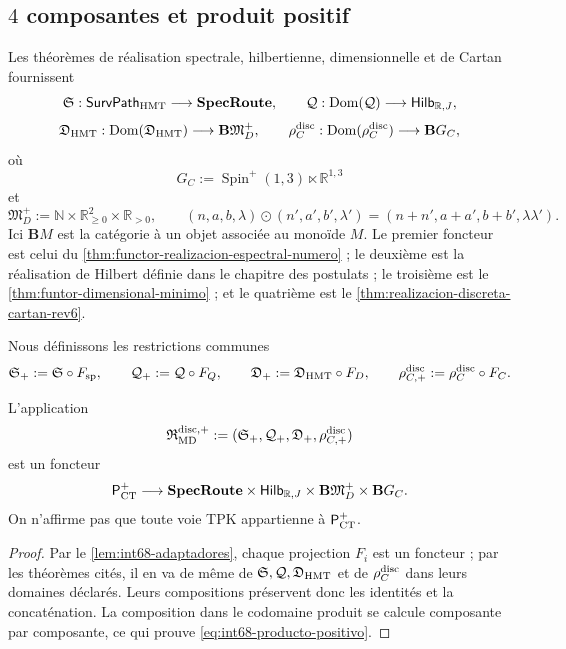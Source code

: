 \subsection{\(4\) composantes et produit positif}

Les théorèmes de réalisation spectrale, hilbertienne, dimensionnelle et de Cartan
fournissent
\[
 \mathfrak S:\mathsf{SurvPath}_{\rm HMT}
      \longrightarrow\mathbf{SpecRoute},
 \qquad
 \mathcal Q:\operatorname{Dom}(\mathcal Q)
      \longrightarrow\mathsf{Hilb}_{\mathbb R,J},
\]
\[
 \mathfrak D_{\rm HMT}:\operatorname{Dom}(\mathfrak D_{\rm HMT})
      \longrightarrow\mathbf B\mathfrak M_D^+,
 \qquad
 \rho_C^{\rm disc}:\operatorname{Dom}(\rho_C^{\rm disc})
      \longrightarrow\mathbf B G_C,
\]
où
\[
 G_C:=\operatorname{Spin}^{+}(1,3)\ltimes\mathbb R^{1,3}
\]
et
\begin{equation}
 \mathfrak M_D^+
 :=\mathbb N\times\mathbb R_{\geq0}^{2}\times\mathbb R_{>0},
 \qquad
 (n,a,b,\lambda)\odot(n',a',b',\lambda')
 =(n+n',a+a',b+b',\lambda\lambda').
 \label{eq:int68-monoide-dimensional-positivo}
\end{equation}
Ici \(\mathbf BM\) est la catégorie à un objet associée au monoïde
\(M\). Le premier foncteur est celui du
\cref{thm:functor-realizacion-espectral-numero} ; le deuxième est la
réalisation de Hilbert définie dans le chapitre des postulats ; le troisième est
le \cref{thm:funtor-dimensional-minimo} ; et le quatrième est le
\cref{thm:realizacion-discreta-cartan-rev6}.

Nous définissons les restrictions communes
\[
 \mathfrak S_+:=\mathfrak S\circ F_{\rm sp},\qquad
 \mathcal Q_+:=\mathcal Q\circ F_Q,\qquad
 \mathfrak D_+:=\mathfrak D_{\rm HMT}\circ F_D,\qquad
 \rho_{C,+}^{\rm disc}:=\rho_C^{\rm disc}\circ F_C.
\]

\begin{theorem}
\label{thm:int68-producto-positivo}
L'application
\begin{equation}
 \mathfrak R_{\rm MD}^{\rm disc,+}
 :=(\mathfrak S_+,\mathcal Q_+,\mathfrak D_+,
       \rho_{C,+}^{\rm disc})
 \label{eq:int68-producto-positivo}
\end{equation}
est un foncteur
\[
 \mathsf P_{\rm CT}^{+}\longrightarrow
 \mathbf{SpecRoute}\times\mathsf{Hilb}_{\mathbb R,J}
 \times\mathbf B\mathfrak M_D^+\times\mathbf BG_C.
\]
On n'affirme pas que toute voie TPK appartienne à \(\mathsf P_{\rm CT}^{+}\).
\end{theorem}

\begin{proof}
Par le \cref{lem:int68-adaptadores}, chaque projection \(F_i\) est un foncteur ;
par les théorèmes cités, il en va de même de
\(\mathfrak S,\mathcal Q,\mathfrak D_{\rm HMT}\) et de
\(\rho_C^{\rm disc}\) dans leurs domaines déclarés. Leurs compositions
préservent donc les identités et la concaténation. La composition dans le codomaine
produit se calcule composante par composante, ce qui prouve
\eqref{eq:int68-producto-positivo}.
\end{proof}


